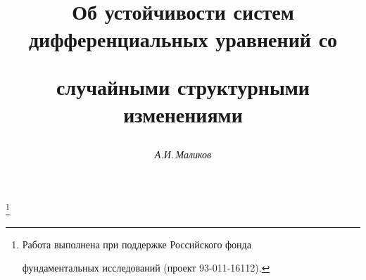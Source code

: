 

 




 


\newcommand{\col}{\operatornamewithlimits{col}} 


\newcommand{\tr}{\operatorname{tr}} 


\newcommand{\tts}[1]{} 


\renewcommand{\baselinestretch}{0.96}


 




 


\setcounter{page}{37} 












 


\author{\it А.И.\,Маликов} 




\title{Об устойчивости систем дифференциальных уравнений со 


случайными структурными изменениями} 


\thanks{Работа выполнена при поддержке Российского фонда 


фундаментальных исследований (проект 93-011-16112).} 


 


\date{} 




